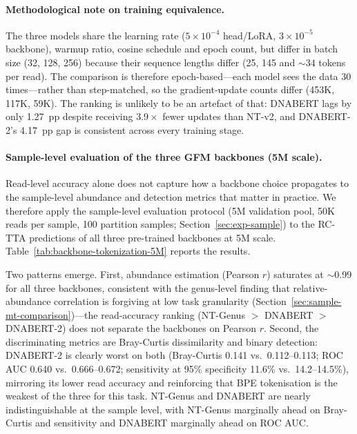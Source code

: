 \paragraph{Methodological note on training equivalence.}
The three models share the learning rate ($5\times10^{-4}$ head/LoRA,
$3\times10^{-5}$ backbone), warmup ratio, cosine schedule and epoch count, but differ
in batch size (32, 128, 256) because their sequence lengths differ (25, 145 and
${\sim}34$ tokens per read). The comparison is therefore epoch-based---each model sees
the data 30 times---rather than step-matched, so the gradient-update counts differ
(453K, 117K, 59K). The ranking is unlikely to be an artefact of that: DNABERT lags by
only 1.27~pp despite receiving $3.9\times$ fewer updates than NT-v2, and DNABERT-2's
4.17~pp gap is consistent across every training stage.

\paragraph{Sample-level evaluation of the three GFM backbones (5M scale).}
Read-level accuracy alone does not capture how a backbone choice propagates to the sample-level abundance and detection metrics that matter in practice.
We therefore apply the sample-level evaluation protocol (5M validation pool, 50K reads per sample, 100 partition samples; Section~\ref{sec:exp-sample}) to the RC-TTA predictions of all three pre-trained backbones at 5M scale.
Table~\ref{tab:backbone-tokenization-5M} reports the results.

Two patterns emerge.
First, abundance estimation (Pearson $r$) saturates at $\sim$0.99 for all three backbones, consistent with the genus-level finding that relative-abundance correlation is forgiving at low task granularity (Section~\ref{sec:sample-mt-comparison})---the read-accuracy ranking (NT-Genus $>$ DNABERT $>$ DNABERT-2) does not separate the backbones on Pearson $r$.
Second, the discriminating metrics are Bray-Curtis dissimilarity and binary detection: DNABERT-2 is clearly worst on both (Bray-Curtis 0.141 vs.\ 0.112--0.113; ROC AUC 0.640 vs.\ 0.666--0.672; sensitivity at 95\% specificity 11.6\% vs.\ 14.2--14.5\%), mirroring its lower read accuracy and reinforcing that BPE tokenisation is the weakest of the three for this task.
NT-Genus and DNABERT are nearly indistinguishable at the sample level, with NT-Genus marginally ahead on Bray-Curtis and sensitivity and DNABERT marginally ahead on ROC AUC.

